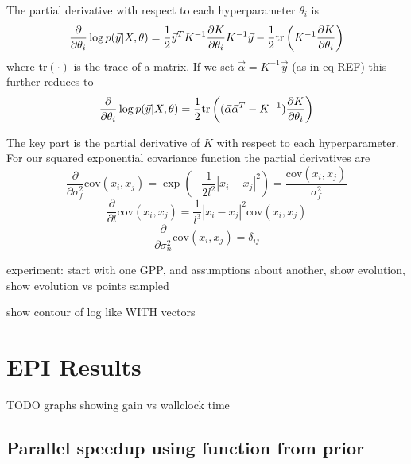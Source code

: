 \documentclass[phd,tocprelim]{cornell}
\begin{document}
The partial derivative with respect to each hyperparameter $\theta_{i}$ is
\begin{equation}
    \frac{\partial}{\partial \theta_{i}} \log p(\vec{y}|X,\theta) = \frac{1}{2}\vec{y}^{T}K^{-1}\frac{\partial K}{\partial \theta_{i}} K^{-1}\vec{y} - \frac{1}{2} {\rm tr}\left( K^{-1}\frac{\partial K}{\partial \theta_{i}} \right)
\end{equation}
where tr$(\cdot)$ is the trace of a matrix. If we set $\vec{\alpha} = K^{-1}\vec{y}$ (as in eq REF) this further reduces to
\begin{equation}
    \frac{\partial}{\partial \theta_{i}} \log p(\vec{y}|X,\theta) = \frac{1}{2} {\rm tr}\left((\vec{\alpha}\vec{\alpha}^{T} - K^{-1})\frac{\partial K}{\partial \theta_{i}}\right)
\end{equation}

The key part is the partial derivative of $K$ with respect to each hyperparameter. For our squared exponential covariance function the partial derivatives are
\begin{equation}
    \frac{\partial}{\partial \sigma_{f}^{2}} \mbox{cov}(x_{i}, x_{j}) = \exp\left( -\frac{1}{2l^{2}} |x_{i} - x_{j}|^{2}\right) = \frac{\mbox{cov}(x_{i}, x_{j})}{\sigma_{f}^{2}}
\end{equation}
\begin{equation}
    \frac{\partial}{\partial l} \mbox{cov}(x_{i}, x_{j}) = \frac{1}{l^{3}}|x_{i} - x_{j}|^{2}\mbox{cov}(x_{i}, x_{j})
\end{equation}
\begin{equation}
    \frac{\partial}{\partial \sigma_{n}^{2}} \mbox{cov}(x_{i}, x_{j}) = \delta_{ij}
\end{equation}

experiment: start with one GPP, and assumptions about another, show evolution, show evolution vs points sampled

show contour of log like WITH vectors



\chapter{EPI Results} %
\label{cha:EPI Results}

TODO graphs showing gain vs wallclock time

\section{Parallel speedup using function from prior}
\end{document}
